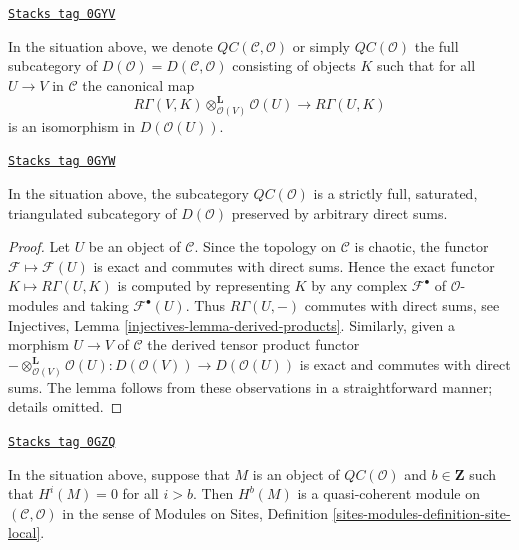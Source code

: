 \begin{definition}[Cartesian]
\label{sites-cohomology-definition-cartesian}
\href{https://stacks.math.columbia.edu/tag/0GYV}{\texttt{Stacks tag 0GYV}}

In the situation above, we denote $\mathit{QC}(\mathcal{C}, \mathcal{O})$
or simply {\it $\mathit{QC}(\mathcal{O})$}
the full subcategory of $D(\mathcal{O}) = D(\mathcal{C}, \mathcal{O})$
consisting of objects $K$ such that
for all $U \to V$ in $\mathcal{C}$ the canonical map
$$
R\Gamma(V, K) \otimes_{\mathcal{O}(V)}^\mathbf{L} \mathcal{O}(U)
\longrightarrow
R\Gamma(U, K)
$$
is an isomorphism in $D(\mathcal{O}(U))$.
\end{definition}

\begin{lemma}
\label{sites-cohomology-lemma-cartesian-good-sub}
\href{https://stacks.math.columbia.edu/tag/0GYW}{\texttt{Stacks tag 0GYW}}

In the situation above, the subcategory $\mathit{QC}(\mathcal{O})$ is a
strictly full, saturated, triangulated subcategory of $D(\mathcal{O})$
preserved by arbitrary direct sums.
\end{lemma}

\begin{proof}
Let $U$ be an object of $\mathcal{C}$. Since the topology
on $\mathcal{C}$ is chaotic, the functor $\mathcal{F} \mapsto \mathcal{F}(U)$
is exact and commutes with direct sums. Hence the exact functor
$K \mapsto R\Gamma(U, K)$ is computed by representing $K$ by any complex
$\mathcal{F}^\bullet$ of $\mathcal{O}$-modules and taking
$\mathcal{F}^\bullet(U)$. Thus $R\Gamma(U, -)$ commutes with direct
sums, see Injectives, Lemma \ref{injectives-lemma-derived-products}.
Similarly, given a morphism $U \to V$ of $\mathcal{C}$
the derived tensor product functor
$- \otimes_{\mathcal{O}(V)}^\mathbf{L} \mathcal{O}(U) :
D(\mathcal{O}(V)) \to D(\mathcal{O}(U))$
is exact and commutes with direct sums. The lemma follows
from these observations in a straightforward manner; details omitted.
\end{proof}

\begin{lemma}
\label{sites-cohomology-lemma-QC-bounded-above}
\href{https://stacks.math.columbia.edu/tag/0GZQ}{\texttt{Stacks tag 0GZQ}}

In the situation above, suppose that $M$ is an object of
$\mathit{QC}(\mathcal{O})$ and $b \in \mathbf{Z}$ such that $H^i(M) = 0$
for all $i > b$. Then $H^b(M)$ is a quasi-coherent module on
$(\mathcal{C}, \mathcal{O})$ in the sense of
Modules on Sites, Definition \ref{sites-modules-definition-site-local}.
\end{lemma}

